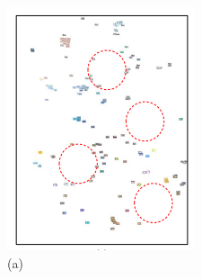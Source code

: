 \documentclass{article}
\begin{document}
\begin{multicols}{2}
\begin{figure}[H]
     \centering
     \begin{minipage}[b]{0.23\textwidth}
         \centering
         \includegraphics[width=\textwidth]{5.png}
         \caption*{(a)}
         \label{fig:Figure_5}
     \end{minipage}
     \hfill
     \begin{minipage}[b]{0.23\textwidth}
         \centering

\end{minipage}
\end{figure}
\end{multicols}
\end{document}
